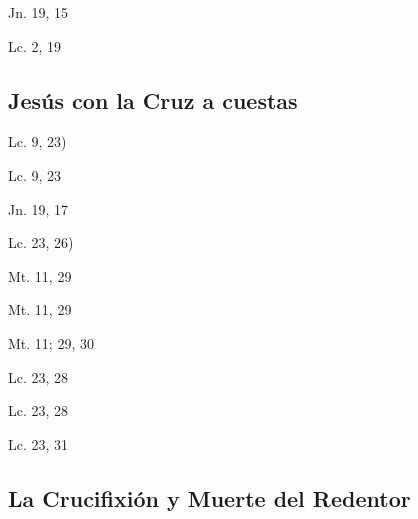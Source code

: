 \documentclass[a4paper,11pt,sans]{article}
\begin{document}
      \begin{center}
        Jn. 19, 15
      \end{center}

      \begin{center}
        Lc. 2, 19
      \end{center}

    \subsection*{\hfil Jesús con la Cruz a cuestas \hfil}
      
      \begin{center}
        Lc. 9, 23)
      \end{center}

      \begin{center}
        Lc. 9, 23
      \end{center}

      \begin{center}
        Jn. 19, 17
      \end{center}

      \begin{center}
        Lc. 23, 26)
      \end{center}

      \begin{center}
        Mt. 11, 29  
      \end{center}

      \begin{center}
        Mt. 11, 29
      \end{center}

      \begin{center}
        Mt. 11; 29, 30
      \end{center}

      \begin{center}
        Lc. 23, 28
      \end{center}

      \begin{center}
        Lc. 23, 28
      \end{center}

      \begin{center}
        Lc. 23, 31
      \end{center}

    \subsection*{\hfil La Crucifixión y Muerte del Redentor \hfil}
      
\end{document}
